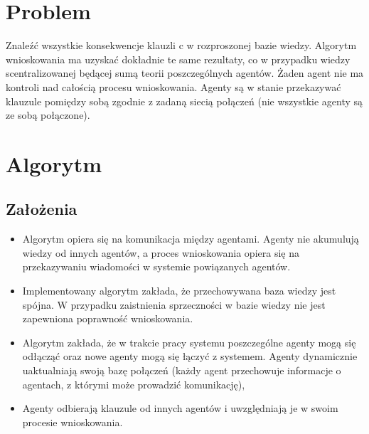 \documentclass[a4paper,12pt]{mwart}
\begin{document}
\section{Problem}
Znaleźć wszystkie konsekwencje klauzli c w rozproszonej bazie wiedzy. Algorytm wnioskowania ma uzyskać dokładnie te same rezultaty, co w przypadku wiedzy scentralizowanej będącej sumą teorii poszczególnych agentów. Żaden agent nie ma kontroli nad całością procesu wnioskowania. Agenty są w stanie przekazywać klauzule pomiędzy sobą zgodnie z zadaną siecią połączeń (nie wszystkie agenty są ze sobą połączone). 


\section{Algorytm}
\subsection{Założenia}
\begin{itemize}
\item Algorytm opiera się na komunikacja między agentami. Agenty nie akumulują wiedzy od innych agentów, a proces wnioskowania opiera się na przekazywaniu wiadomości w systemie powiązanych agentów.
\item Implementowany algorytm zakłada, że przechowywana baza wiedzy jest spójna. W przypadku zaistnienia sprzeczności w bazie wiedzy nie jest zapewniona poprawność wnioskowania.
\item Algorytm zakłada, że w trakcie pracy systemu poszczególne agenty mogą się odłącząć oraz nowe agenty mogą się łączyć z systemem. Agenty dynamicznie uaktualniają swoją bazę połączeń (każdy agent przechowuje informacje o agentach, z którymi może prowadzić komunikację),
\item Agenty odbierają klauzule od innych agentów i uwzględniają je w swoim procesie wnioskowania.
\end{itemize}
\end{document}
